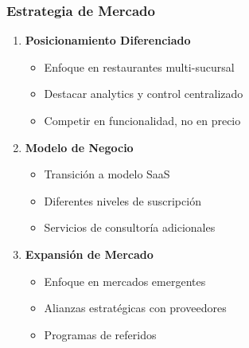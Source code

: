 \documentclass[12pt,a4paper]{article}
\begin{document}
\subsubsection{Estrategia de Mercado}
\begin{enumerate}
    \item \textbf{Posicionamiento Diferenciado}
    \begin{itemize}
        \item Enfoque en restaurantes multi-sucursal
        \item Destacar analytics y control centralizado
        \item Competir en funcionalidad, no en precio
    \end{itemize}
    
    \item \textbf{Modelo de Negocio}
    \begin{itemize}
        \item Transición a modelo SaaS
        \item Diferentes niveles de suscripción
        \item Servicios de consultoría adicionales
    \end{itemize}
    
    \item \textbf{Expansión de Mercado}
    \begin{itemize}
        \item Enfoque en mercados emergentes
        \item Alianzas estratégicas con proveedores
        \item Programas de referidos
    \end{itemize}
\end{enumerate}
\end{document}
